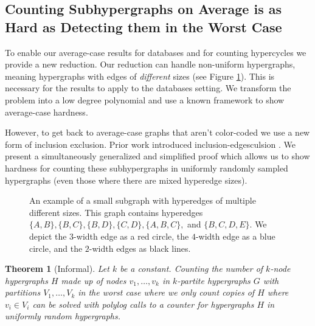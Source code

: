 \documentclass[11pt,letterpaper,pdftex]{article}
\newtheorem{theorem}{Theorem}[section]
\begin{document}
\subsection{Counting Subhypergraphs on Average is as Hard as Detecting them in the Worst Case }
To enable our average-case results for databases and for counting hypercycles we provide a new reduction. 
Our reduction can handle non-uniform hypergraphs, meaning hypergraphs with edges of \emph{different} sizes (see Figure \ref{fig:exampleOfSmallGraph}).
This is necessary for the results to apply to the databases setting.
We transform the problem into a low degree polynomial and use a known framework to show average-case hardness. 

However, to get back to average-case graphs that aren't color-coded we use a new form of inclusion exclusion. 
Prior work introduced inclusion-edgesculsion \cite{LVW18}. 
We present a simultaneously generalized and simplified proof which allows us to show hardness for counting these subhypergraphs in uniformly randomly sampled hypergraphs (even those where there are mixed hyperedge sizes). 

\begin{figure}[ht]
    \centering
    \caption{An example of a small subgraph with hyperedges of multiple different sizes. This graph contains hyperedges $\{A,B\}, \{B,C\}, \{B, D\}, \{C, D\}, \{A,B,C\},$ and $\{B,C,D,E\}$. We depict the $3$-width edge as a red circle, the $4$-width edge as a blue circle, and the $2$-width edges as black lines.}
    \label{fig:exampleOfSmallGraph} 
\end{figure}

\begin{theorem} [Informal]\label{thm: informal wc to ac}
Let $k$ be a constant. 
Counting the number of $k$-node hypergraphs $H$ made up of nodes $v_1,\ldots, v_k$ in $k$-partite hypergraphs $G$ with partitions $V_1, \ldots, V_k$ in the worst case where we only count copies of $H$ where $v_i \in V_i$ can be solved with polylog calls to a counter for hypergraphs $H$ in uniformly random hypergraphs.
\end{theorem}
\end{document}
